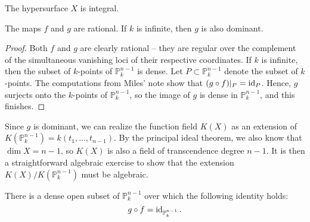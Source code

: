 \documentclass[letterpaper, openany, 10pt]{article}
\begin{document}
\begin{corollary}
	The hypersurface $X$ is integral.
\end{corollary}

\begin{lemma}
	The maps $f$ and $g$ are rational. If $k$ is infinite, then $g$ is also dominant.
\end{lemma}

\begin{proof}
	Both $f$ and $g$ are clearly rational -- they are regular over the complement of the simultaneous vanishing loci of their respective coordinates. If $k$ is infinite, then the subset of $k$-points of $\mathbb{P}_k^{n-1}$ is dense. Let $P \subset \mathbb{P}_k^{n-1}$ denote the subset of $k$-points. The computations from Miles' note show that $(g \circ f)|_P = \operatorname{id}_P$. Hence, $g$ surjects onto the $k$-points of $\mathbb{P}_k^{n-1}$, so the image of $g$ is dense in $\mathbb{P}_k^{n-1}$, and this finishes.
\end{proof}

Since $g$ is dominant, we can realize the function field $K(X)$ as an extension of $K(\mathbb{P}_k^{n-1}) = k(t_1, \ldots, t_{n-1})$. By the principal ideal theorem, we also know that $\dim X = n-1$, so $K(X)$ is also a field of transcendence degree $n-1$. It is then a straightforward algebraic exercise to show that the extension $K(X)/K(\mathbb{P}_k^{n-1})$ must be algebraic. 

\begin{claim}
	There is a dense open subset of $\mathbb{P}_k^{n-1}$ over which the following identity holds:
	\[
		g \circ f = \operatorname{id}_{\mathbb{P}_k^{n-1}}.
	\]
\end{claim}
\end{document}
